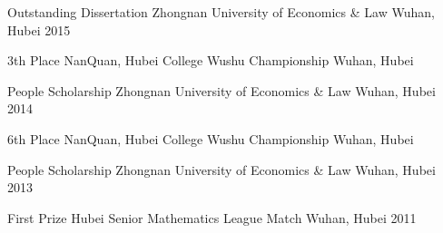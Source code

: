 \begin{cvhonors}
\cvhonor
{Outstanding Dissertation} %
{Zhongnan University of Economics \& Law} %
{Wuhan, Hubei} %
{2015 } %



\cvhonor
{3th Place} %
{NanQuan, Hubei College Wushu Championship} %
{Wuhan, Hubei} %
{ } %


\cvhonor
{People Scholarship} %
{Zhongnan University of Economics \& Law} %
{Wuhan, Hubei} %
{2014} %


\cvhonor
{6th Place} %
{NanQuan, Hubei College Wushu Championship} %
{Wuhan, Hubei} %
{ } %


\cvhonor
{People Scholarship} %
{Zhongnan University of Economics \& Law} %
{Wuhan, Hubei} %
{2013} %


\cvhonor
{First Prize} %
{Hubei Senior Mathematics League Match} %
{Wuhan, Hubei} %
{2011} %

\end{cvhonors}